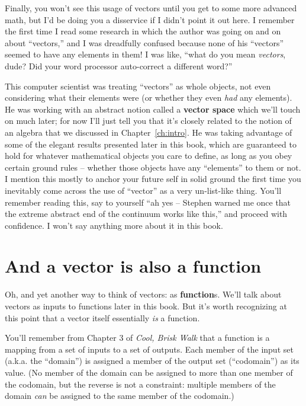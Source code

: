 Finally, you won't see this usage of vectors until you get to some more
advanced math, but I'd be doing you a disservice if I didn't point it out here.
I remember the first time I read some research in which the author was going on
and on about ``vectors,'' and I was dreadfully confused because none of his
``vectors'' seemed to have any elements in them! I was like, ``what do you mean
\textit{vectors}, dude? Did your word processor auto-correct a different
word?''


This computer scientist was treating ``vectors'' as whole objects, not even
considering what their elements were (or whether they even \textit{had} any
elements). He was working with an abstract notion called a \textbf{vector
space} which we'll touch on much later; for now I'll just tell you that it's
closely related to the notion of an algebra that we discussed in
Chapter~\ref{ch:intro}. He was taking advantage of some of the elegant results
presented later in this book, which are guaranteed to hold for whatever
mathematical objects you care to define, as long as you obey certain ground
rules -- whether those objects have any ``elements'' to them or not. I mention
this mostly to anchor your future self in solid ground the first time you
inevitably come across the use of ``vector'' as a very un-list-like thing.
You'll remember reading this, say to yourself ``ah yes -- Stephen warned me
once that the extreme abstract end of the continuum works like this,'' and
proceed with confidence. I won't say anything more about it in this book.

\section{And a vector is also a function}


Oh, and yet another way to think of vectors: as \textbf{function}s. We'll talk
about vectors as inputs to functions later in this book. But it's worth
recognizing at this point that a vector itself essentially \textit{is} a
function.


You'll remember from Chapter 3 of \textit{Cool, Brisk Walk} that a function is
a mapping from a set of inputs to a set of outputs. Each member of the input
set (a.k.a. the ``domain'') is assigned a member of the output set
(``codomain'') as its value. (No member of the domain can be assigned to more
than one member of the codomain, but the reverse is not a constraint: multiple
members of the domain \textit{can} be assigned to the same member of the
codomain.)

